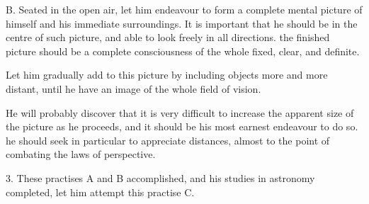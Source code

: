 \begin{quoting}

B. Seated in the open air, let him endeavour to form a complete mental picture of himself and his immediate surroundings. It is important that he should be in the centre of such picture, and able to look freely in all directions. the finished picture should be a complete consciousness of the whole fixed, clear, and definite.

Let him gradually add to this picture by including objects more and more distant, until he have an image of the whole field of vision.

He will probably discover that it is very difficult to increase the apparent size of the picture as he proceeds, and it should be his most earnest endeavour to do so. he should seek in particular to appreciate distances, almost to the point of combating the laws of perspective.

\end{quoting}


3. These practises A and B accomplished, and his studies in astronomy completed, let him attempt this practise C.


